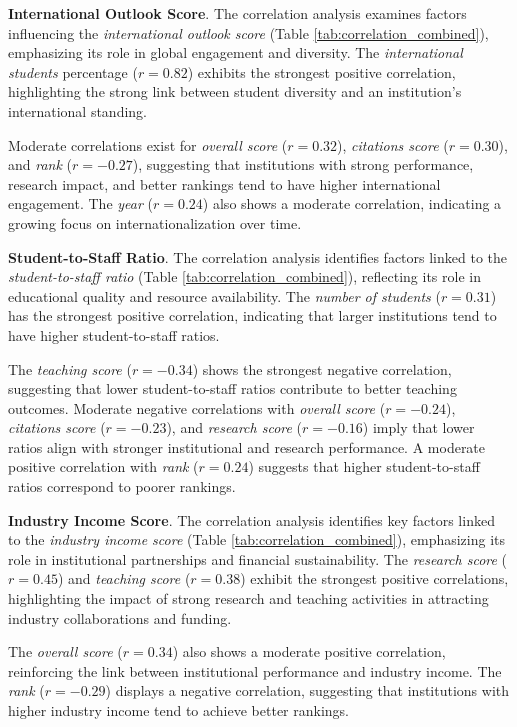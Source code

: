 \documentclass[conference]{IEEEtran}
\begin{document}
\textbf{International Outlook Score}. The correlation analysis examines factors influencing the \textit{international outlook score} (Table \ref{tab:correlation_combined}), emphasizing its role in global engagement and diversity. The \textit{international students} percentage ($r = 0.82$) exhibits the strongest positive correlation, highlighting the strong link between student diversity and an institution’s international standing.

Moderate correlations exist for \textit{overall score} ($r = 0.32$), \textit{citations score} ($r = 0.30$), and \textit{rank} ($r = -0.27$), suggesting that institutions with strong performance, research impact, and better rankings tend to have higher international engagement. The \textit{year} ($r = 0.24$) also shows a moderate correlation, indicating a growing focus on internationalization over time.

\textbf{Student-to-Staff Ratio}. The correlation analysis identifies factors linked to the \textit{student-to-staff ratio} (Table \ref{tab:correlation_combined}), reflecting its role in educational quality and resource availability. The \textit{number of students} ($r = 0.31$) has the strongest positive correlation, indicating that larger institutions tend to have higher student-to-staff ratios.

The \textit{teaching score} ($r = -0.34$) shows the strongest negative correlation, suggesting that lower student-to-staff ratios contribute to better teaching outcomes. Moderate negative correlations with \textit{overall score} ($r = -0.24$), \textit{citations score} ($r = -0.23$), and \textit{research score} ($r = -0.16$) imply that lower ratios align with stronger institutional and research performance. A moderate positive correlation with \textit{rank} ($r = 0.24$) suggests that higher student-to-staff ratios correspond to poorer rankings.


\textbf{Industry Income Score}. The correlation analysis identifies key factors linked to the \textit{industry income score} (Table \ref{tab:correlation_combined}), emphasizing its role in institutional partnerships and financial sustainability. The \textit{research score} ($r = 0.45$) and \textit{teaching score} ($r = 0.38$) exhibit the strongest positive correlations, highlighting the impact of strong research and teaching activities in attracting industry collaborations and funding.

The \textit{overall score} ($r = 0.34$) also shows a moderate positive correlation, reinforcing the link between institutional performance and industry income. The \textit{rank} ($r = -0.29$) displays a negative correlation, suggesting that institutions with higher industry income tend to achieve better rankings.
\end{document}
